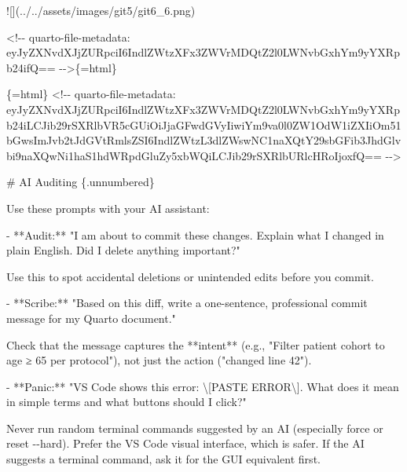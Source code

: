 \documentclass[
  letterpaper,
  DIV=11,
  numbers=noendperiod,
  oneside]{scrreprt}
\newenvironment{Shaded}{\begin{snugshade}}{\end{snugshade}}
\newcommand{\AlertTok}[1]{\textcolor[rgb]{0.68,0.00,0.00}{#1}}
\newcommand{\FunctionTok}[1]{\textcolor[rgb]{0.28,0.35,0.67}{#1}}
\newcommand{\InformationTok}[1]{\textcolor[rgb]{0.37,0.37,0.37}{#1}}
\newcommand{\NormalTok}[1]{\textcolor[rgb]{0.00,0.23,0.31}{#1}}
\newcommand{\SpecialCharTok}[1]{\textcolor[rgb]{0.37,0.37,0.37}{#1}}
\newcommand{\SpecialStringTok}[1]{\textcolor[rgb]{0.13,0.47,0.30}{#1}}
\begin{document}
\begin{Shaded}
\begin{Highlighting}[numbers=left,,]
    \AlertTok{![](../../assets/images/git5/git6\_6.png)}


\InformationTok{\textasciigrave{}\textless{}!{-}{-} quarto{-}file{-}metadata: eyJyZXNvdXJjZURpciI6IndlZWtzXFx3ZWVrMDQtZ2l0LWNvbGxhYm9yYXRpb24ifQ== {-}{-}\textgreater{}\textasciigrave{}}\NormalTok{\{=html\}}

\InformationTok{\textasciigrave{}\textasciigrave{}\textasciigrave{}\{=html\}}
\InformationTok{\textless{}!{-}{-} quarto{-}file{-}metadata: eyJyZXNvdXJjZURpciI6IndlZWtzXFx3ZWVrMDQtZ2l0LWNvbGxhYm9yYXRpb24iLCJib29rSXRlbVR5cGUiOiJjaGFwdGVyIiwiYm9va0l0ZW1OdW1iZXIiOm51bGwsImJvb2tJdGVtRmlsZSI6IndlZWtzL3dlZWswNC1naXQtY29sbGFib3JhdGlvbi9naXQwNi1haS1hdWRpdGluZy5xbWQiLCJib29rSXRlbURlcHRoIjoxfQ== {-}{-}\textgreater{}}
\InformationTok{\textasciigrave{}\textasciigrave{}\textasciigrave{}}

\FunctionTok{\# AI Auditing \{.unnumbered\}}


\NormalTok{Use these prompts with your AI assistant:}

\SpecialStringTok{{-}   }\NormalTok{**Audit:** "I am about to commit these changes. Explain what I changed in plain English. Did I delete anything important?"}

\NormalTok{    Use this to spot accidental deletions or unintended edits before you commit.}

\SpecialStringTok{{-}   }\NormalTok{**Scribe:** "Based on this diff, write a one{-}sentence, professional commit message for my Quarto document."}

\NormalTok{    Check that the message captures the **intent** (e.g., }\InformationTok{\textasciigrave{}"Filter patient cohort to age ≥ 65 per protocol"\textasciigrave{}}\NormalTok{), not just the action (}\InformationTok{\textasciigrave{}"changed line 42"\textasciigrave{}}\NormalTok{).}

\SpecialStringTok{{-}   }\NormalTok{**Panic:** "VS Code shows this error: }\SpecialCharTok{\textbackslash{}[}\NormalTok{PASTE ERROR}\SpecialCharTok{\textbackslash{}]}\NormalTok{. What does it mean in simple terms and what buttons should I click?"}

\NormalTok{    Never run random terminal commands suggested by an AI (especially }\InformationTok{\textasciigrave{}{-}{-}force\textasciigrave{}}\NormalTok{ or }\InformationTok{\textasciigrave{}reset {-}{-}hard\textasciigrave{}}\NormalTok{). Prefer the VS Code visual interface, which is safer. If the AI suggests a terminal command, ask it for the GUI equivalent first.}



\end{Highlighting}
\end{Shaded}
\end{document}
